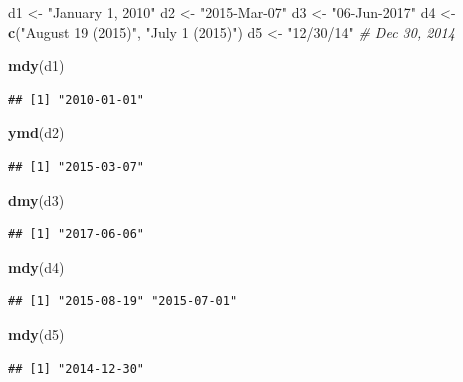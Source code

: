 \documentclass[]{book}
\newenvironment{Shaded}{\begin{snugshade}}{\end{snugshade}}
\newcommand{\CommentTok}[1]{\textcolor[rgb]{0.56,0.35,0.01}{\textit{#1}}}
\newcommand{\KeywordTok}[1]{\textcolor[rgb]{0.13,0.29,0.53}{\textbf{#1}}}
\newcommand{\NormalTok}[1]{#1}
\newcommand{\StringTok}[1]{\textcolor[rgb]{0.31,0.60,0.02}{#1}}
\theoremstyle{definition}
\theoremstyle{definition}
\theoremstyle{definition}
\theoremstyle{remark}
\begin{document}
\begin{enumerate}
\begin{Shaded}
\begin{Highlighting}[]
\NormalTok{d1 <-}\StringTok{ "January 1, 2010"}
\NormalTok{d2 <-}\StringTok{ "2015-Mar-07"}
\NormalTok{d3 <-}\StringTok{ "06-Jun-2017"}
\NormalTok{d4 <-}\StringTok{ }\KeywordTok{c}\NormalTok{(}\StringTok{"August 19 (2015)"}\NormalTok{, }\StringTok{"July 1 (2015)"}\NormalTok{)}
\NormalTok{d5 <-}\StringTok{ "12/30/14"} \CommentTok{# Dec 30, 2014}
\end{Highlighting}
\end{Shaded}

\begin{Shaded}
\begin{Highlighting}[]
\KeywordTok{mdy}\NormalTok{(d1)}
\end{Highlighting}
\end{Shaded}

\begin{verbatim}
## [1] "2010-01-01"
\end{verbatim}

\begin{Shaded}
\begin{Highlighting}[]
\KeywordTok{ymd}\NormalTok{(d2)}
\end{Highlighting}
\end{Shaded}

\begin{verbatim}
## [1] "2015-03-07"
\end{verbatim}

\begin{Shaded}
\begin{Highlighting}[]
\KeywordTok{dmy}\NormalTok{(d3)}
\end{Highlighting}
\end{Shaded}

\begin{verbatim}
## [1] "2017-06-06"
\end{verbatim}

\begin{Shaded}
\begin{Highlighting}[]
\KeywordTok{mdy}\NormalTok{(d4)}
\end{Highlighting}
\end{Shaded}

\begin{verbatim}
## [1] "2015-08-19" "2015-07-01"
\end{verbatim}

\begin{Shaded}
\begin{Highlighting}[]
\KeywordTok{mdy}\NormalTok{(d5)}
\end{Highlighting}
\end{Shaded}

\begin{verbatim}
## [1] "2014-12-30"
\end{verbatim}
\end{enumerate}
\end{document}
